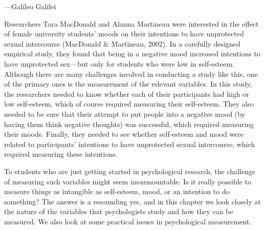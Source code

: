  {---Galileo Galilei}


Researchers Tara MacDonald and Alanna Martineau were interested in the effect of female university students' moods on their intentions to have unprotected sexual intercourse (MacDonald \& Martineau, 2002). In a carefully designed empirical study, they found that being in a negative mood increased intentions to have unprotected sex—but only for students who were low in self-esteem. Although there are many challenges involved in conducting a study like this, one of the primary ones is the measurement of the relevant variables. In this study, the researchers needed to know whether each of their participants had high or low self-esteem, which of course required measuring their self-esteem. They also needed to be sure that their attempt to put people into a negative mood (by having them think negative thoughts) was successful, which required measuring their moods. Finally, they needed to see whether self-esteem and mood were related to participants' intentions to have unprotected sexual intercourse, which required measuring these intentions.


To students who are just getting started in psychological research, the challenge of measuring such variables might seem insurmountable. Is it really possible to measure things as intangible as self-esteem, mood, or an intention to do something? The answer is a resounding yes, and in this chapter we look closely at the nature of the variables that psychologists study and how they can be measured. We also look at some practical issues in psychological measurement.

